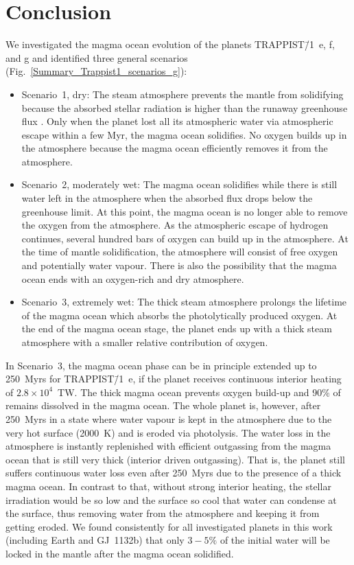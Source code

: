 \documentclass[paper=letterpaper,fontsize=12pt,oneside,twocolumn]{article}
\begin{document}
\section{Conclusion}
\label{sec: conclusion}
We investigated the magma ocean evolution of the planets TRAPPIST\=/1~e, f, and g and identified three general scenarios (Fig.~\ref{Summary_Trappist1_scenarios_g}):
\begin{itemize}
    \item Scenario~1, dry: The steam atmosphere prevents the mantle from solidifying because the absorbed stellar radiation is higher than the runaway greenhouse flux \citep[Sec.~\ref{Sec_Flux} and][]{Goldblatt2013}. Only when the planet lost all its atmospheric water via atmospheric escape within a few Myr, the magma ocean solidifies. No oxygen builds up in the atmosphere because the magma ocean efficiently removes it from the atmosphere.
    \item Scenario~2, moderately wet: The magma ocean solidifies while there is still water left in the atmosphere when the absorbed flux drops below the greenhouse limit. At this point, the magma ocean is no longer able to remove the oxygen from the atmosphere. As the atmospheric escape of hydrogen continues, several hundred bars of oxygen can build up in the atmosphere. At the time of mantle solidification, the atmosphere will consist of free oxygen and potentially water vapour. There is also the possibility that the magma ocean ends with an oxygen-rich and dry atmosphere.
    \item Scenario~3, extremely wet:
    The thick steam atmosphere prolongs the lifetime of the magma ocean which absorbs the photolytically produced oxygen. At the end of the magma ocean stage, the planet ends up with a thick steam atmosphere with a smaller relative contribution of oxygen.
\end{itemize}

In Scenario~3, the magma ocean phase can be in principle extended up to 250~Myrs for TRAPPIST\=/1~e, if the planet receives continuous interior heating of $2.8 \times 10^4$~TW. The thick magma ocean prevents oxygen build-up and 90\% of  remains dissolved in the magma ocean. The whole planet is, however, after 250~Myrs in a state where water vapour is kept in the atmosphere due to the very hot surface (2000~K) and is eroded via photolysis. The water loss in the atmosphere is instantly replenished with efficient outgassing from the magma ocean that is still very thick (interior driven outgassing). That is, the planet still suffers continuous water loss even after 250~Myrs due to the presence of a thick magma ocean. In contrast to that, without strong interior heating, the stellar irradiation would be so low and the surface so cool that water can condense at the surface, thus removing water from the atmosphere and keeping it from getting eroded.
We found consistently for all investigated planets in this work (including Earth and GJ~1132b) that only $3-5\%$ of the initial water will be locked in the mantle after the magma ocean solidified.
\end{document}
